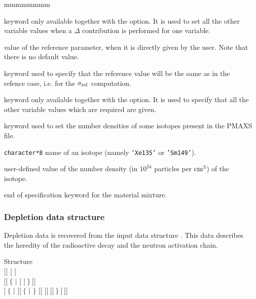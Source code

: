 \begin{ListeDeDescription}{mmmmmmmm}
\item[\moc{REF}] keyword only available together with the  option. It is used to set all the other variable values when a $\Delta$ contribution is performed for one variable.  

\item[\dusa{valref}] value of the reference parameter, when it is directly given by the user. Note that there is no default value.

\item[\moc{SAMEASREF}] keyword used to specify that the reference value will be the same as in the refence case, i.e. for the $\sigma_{\rm ref}$ computation.

\item[\moc{ENDREF}] keyword only available together with the  option. It is used to specify that all the other variable values which are required are given.  

\item[\moc{MICRO}] keyword used to set the number densities of some isotopes present in the PMAXS file.

\item[\dusa{HISO}] {\tt character*8} name of an isotope (namely {\tt 'Xe135'} or {\tt 'Sm149'}).

\item[\dusa{conc}] user-defined value of the number density (in $10^{24}$ particles per ${\rm cm}^3$) of the isotope.

\item[\moc{ENDMIX}] end of specification keyword for the material mixture.

\end{ListeDeDescription}

\subsubsection{Depletion data structure}\label{sect:descdepld}

Depletion data is recovered from the input data structure . This data describes the heredity of the radioactive decay
and the neutron activation chain.

\begin{DataStructure}{Structure }
  \\
\hskip 0.3cm $[[$  $[$  $]$ \\
\hskip 1.0cm $[[~\{$   $|$  $[$  $]~\}~]]$ \\
\hskip 0.6cm $[~\{$  $|$  $[[~\{$  $|$  $\}$
$[[$   $]]~]]~\}~]~]]$\\
\end{DataStructure}

